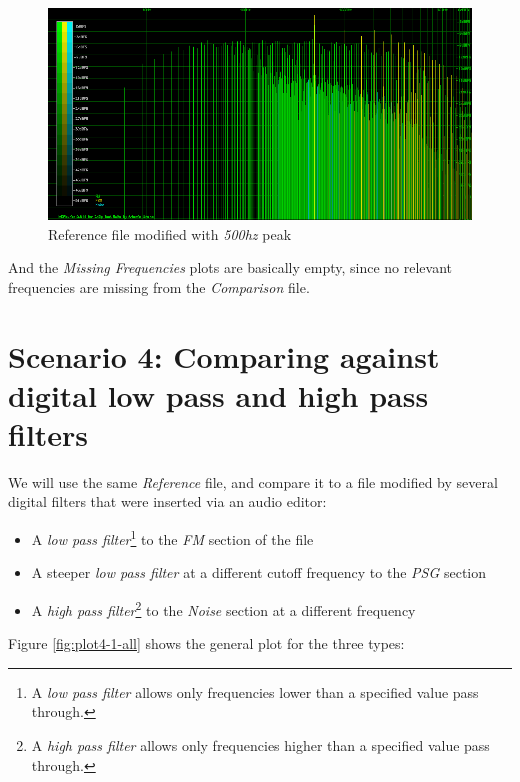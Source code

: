 \documentclass[10pt,a4paper]{report}
\begin{document}
\begin{figure}[H]
	\centering
	\includegraphics[width=1.0\linewidth]{images/interpretation/Plot3-Spectrogram-500hz.png}
	\caption[Reference File]{Reference file modified with \textit{500hz} peak}
	\label{fig:plot3-spectrogram-500Hz}
\end{figure}


And the \textit{Missing Frequencies} plots are basically empty, since no relevant frequencies are missing from the \textit{Comparison} file.

\section{Scenario 4: Comparing against digital low pass and high pass filters}

We will use the same \textit{Reference} file, and compare it to a file modified by several digital filters that were inserted via an audio editor:

\begin{itemize}
	\item A \textit{low pass filter}\footnote{A \textit{low pass filter} allows only frequencies lower than a specified value pass through.} to the \textit{FM} section of the file
	\item A steeper \textit{low pass filter} at a different cutoff frequency to the \textit{PSG} section
	\item A \textit{high pass filter}\footnote{A \textit{high pass filter} allows only frequencies higher than a specified value pass through.} to the \textit{Noise} section at a different frequency
\end{itemize}

Figure \ref{fig:plot4-1-all} shows the general plot for the three types:
\end{document}
